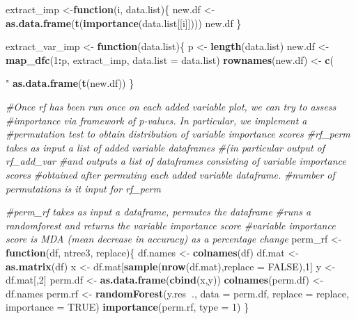 \documentclass[12pt,twoside]{reedthesis}
\newenvironment{Shaded}{\begin{snugshade}}{\end{snugshade}}
\newcommand{\KeywordTok}[1]{\textcolor[rgb]{0.13,0.29,0.53}{\textbf{#1}}}
\newcommand{\DataTypeTok}[1]{\textcolor[rgb]{0.13,0.29,0.53}{#1}}
\newcommand{\DecValTok}[1]{\textcolor[rgb]{0.00,0.00,0.81}{#1}}
\newcommand{\StringTok}[1]{\textcolor[rgb]{0.31,0.60,0.02}{#1}}
\newcommand{\CommentTok}[1]{\textcolor[rgb]{0.56,0.35,0.01}{\textit{#1}}}
\newcommand{\OtherTok}[1]{\textcolor[rgb]{0.56,0.35,0.01}{#1}}
\newcommand{\ControlFlowTok}[1]{\textcolor[rgb]{0.13,0.29,0.53}{\textbf{#1}}}
\newcommand{\OperatorTok}[1]{\textcolor[rgb]{0.81,0.36,0.00}{\textbf{#1}}}
\newcommand{\NormalTok}[1]{#1}
\theoremstyle{definition}
\theoremstyle{definition}
\theoremstyle{definition}
\theoremstyle{remark}
\begin{document}
\begin{Shaded}
\begin{Highlighting}[]
\NormalTok{extract_imp <-}\ControlFlowTok{function}\NormalTok{(i, data.list)\{}
\NormalTok{  new.df <-}\StringTok{ }\KeywordTok{as.data.frame}\NormalTok{(}\KeywordTok{t}\NormalTok{(}\KeywordTok{importance}\NormalTok{(data.list[[i]])))}
\NormalTok{  new.df}
\NormalTok{\}}

\NormalTok{extract_var_imp <-}\StringTok{ }\ControlFlowTok{function}\NormalTok{(data.list)\{}
\NormalTok{  p <-}\StringTok{ }\KeywordTok{length}\NormalTok{(data.list)}
\NormalTok{  new.df <-}\StringTok{ }\KeywordTok{map_dfc}\NormalTok{(}\DecValTok{1}\OperatorTok{:}\NormalTok{p, extract_imp, }\DataTypeTok{data.list =}\NormalTok{ data.list)}
  \KeywordTok{rownames}\NormalTok{(new.df) <-}\StringTok{ }\KeywordTok{c}\NormalTok{(}\StringTok{"%IncMSE"}\NormalTok{, }\StringTok{"IncNodePurity"}\NormalTok{)}
  \KeywordTok{as.data.frame}\NormalTok{(}\KeywordTok{t}\NormalTok{(new.df))}
\NormalTok{\}}


\CommentTok{#Once rf has been run once on each added variable plot, we can try to assess}
\CommentTok{#importance via framework of p-values. In particular, we implement a }
\CommentTok{#permutation test to obtain distribution of variable importance scores }
\CommentTok{#rf_perm takes as input a list of added variable dataframes }
\CommentTok{#(in particular output of rf_add_var}
\CommentTok{#and outputs a list of dataframes consisting of variable importance scores }
\CommentTok{#obtained after permuting each added variable dataframe. }
\CommentTok{#number of permutations is it input for rf_perm}

\CommentTok{#perm_rf takes as input a dataframe, permutes the dataframe}
\CommentTok{#runs a randomforest and returns the variable importance score}
\CommentTok{#variable importance score is MDA (mean decrease in accuracy) as a percentage change}
\NormalTok{perm_rf <-}\ControlFlowTok{function}\NormalTok{(df, ntree3, replace)\{}
\NormalTok{  df.names <-}\StringTok{ }\KeywordTok{colnames}\NormalTok{(df)}
\NormalTok{  df.mat <-}\StringTok{ }\KeywordTok{as.matrix}\NormalTok{(df)}
\NormalTok{  x <-}\StringTok{ }\NormalTok{df.mat[}\KeywordTok{sample}\NormalTok{(}\KeywordTok{nrow}\NormalTok{(df.mat),}\DataTypeTok{replace =} \OtherTok{FALSE}\NormalTok{),}\DecValTok{1}\NormalTok{]}
\NormalTok{  y <-}\StringTok{ }\NormalTok{df.mat[,}\DecValTok{2}\NormalTok{]}
\NormalTok{  perm.df <-}\StringTok{ }\KeywordTok{as.data.frame}\NormalTok{(}\KeywordTok{cbind}\NormalTok{(x,y))}
  \KeywordTok{colnames}\NormalTok{(perm.df) <-}\StringTok{ }\NormalTok{df.names}
\NormalTok{  perm.rf <-}\StringTok{ }\KeywordTok{randomForest}\NormalTok{(y.res}\OperatorTok{~}\NormalTok{., }\DataTypeTok{data =}\NormalTok{ perm.df, }\DataTypeTok{replace =}\NormalTok{ replace, }\DataTypeTok{importance =} \OtherTok{TRUE}\NormalTok{)}
  \KeywordTok{importance}\NormalTok{(perm.rf, }\DataTypeTok{type =} \DecValTok{1}\NormalTok{)}
\NormalTok{\}}

}
\end{Highlighting}
\end{Shaded}
\end{document}
